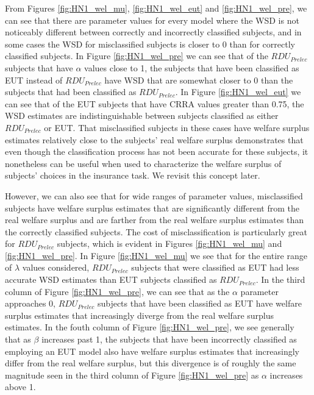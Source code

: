 \documentclass[../main.tex]{subfiles}
\begin{document}
From Figures \ref{fig:HN1_wel_mu}, \ref{fig:HN1_wel_eut} and \ref{fig:HN1_wel_pre}, we can see that there are parameter values for every model where the WSD is not noticeably different between correctly and incorrectly classified subjects, and in some cases the WSD for misclassified subjects is closer to 0 than for correctly classified subjects.
In Figure \ref{fig:HN1_wel_pre} we can see that of the $\mathit{RDU_{Prelec}}$ subjects that have $\alpha$ values close to 1, the subjects that have been classified as EUT instead of $\mathit{RDU_{Prelec}}$ have WSD that are somewhat closer to 0 than the subjects that had been classified as $\mathit{RDU_{Prelec}}$.
In Figure \ref{fig:HN1_wel_eut} we can see that of the EUT subjects that have CRRA values greater than 0.75, the WSD estimates are indistinguishable between subjects classified as either $\mathit{RDU_{Prelec}}$ or EUT.
That misclassified subjects in these cases have welfare surplus estimates relatively close to the subjects' real welfare surplus demonstrates that even though the classification process has not been accurate for these subjects, it nonetheless can be useful when used to characterize the welfare surplus of subjects' choices in the insurance task.
We revisit this concept later.

However, we can also see that for wide ranges of parameter values, misclassified subjects have welfare surplus estimates that are significantly different from the real welfare surplus and are farther from the real welfare surplus estimates than the correctly classified subjects.
The cost of misclassification is particularly great for $\mathit{RDU_{Prelec}}$ subjects, which is evident in Figures \ref{fig:HN1_wel_mu} and \ref{fig:HN1_wel_pre}.
In Figure \ref{fig:HN1_wel_mu} we see that for the entire range of $\lambda$ values considered, $\mathit{RDU_{Prelec}}$ subjects that were classified as EUT had less accurate WSD estimates than EUT subjects classified as $\mathit{RDU_{Prelec}}$.
In the third column of Figure \ref{fig:HN1_wel_pre}, we can see that as the $\alpha$ parameter approaches 0, $\mathit{RDU_{Prelec}}$ subjects that have been classified as EUT have welfare surplus estimates that increasingly diverge from the real welfare surplus estimates.
In the fouth column of Figure \ref{fig:HN1_wel_pre}, we see generally that as $\beta$ increases past 1, the subjects that have been incorrectly classified as employing an EUT model also have welfare surplus estimates that increasingly differ from the real welfare surplus, but this divergence is of roughly the same magnitude seen in the third column of Figure \ref{fig:HN1_wel_pre} as $\alpha$ increases above 1.
\end{document}
